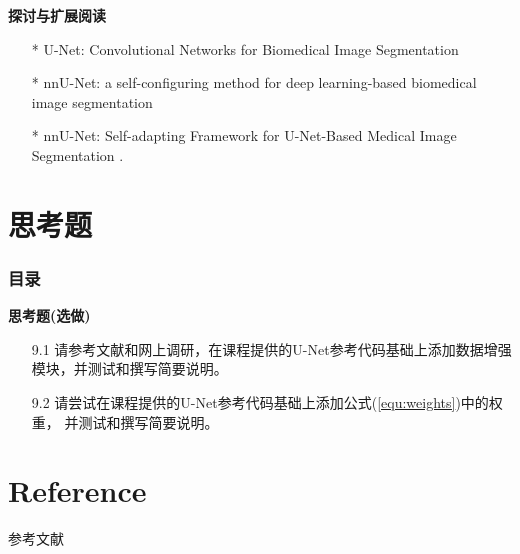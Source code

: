 \documentclass{beamer}%
\begin{document}
\begin{frame}[allowframebreaks]
\vspace{-0.1cm}
{\noindent\large\textbf{探讨与扩展阅读}}
\vspace{0.4cm}
\begin{itemize}
    \item[*] U-Net: Convolutional Networks for Biomedical Image Segmentation \citep{Unet2015Olaf}
    \item[*] nnU-Net: a self-configuring method for deep learning-based biomedical image segmentation \citep{Isensee2021NM}
    \item[*] nnU-Net: Self-adapting Framework for U-Net-Based Medical Image Segmentation \citep{Isensee2019}.
\end{itemize}
\end{frame}




\section{思考题}
\begin{frame}[allowframebreaks]
  \frametitle{\textsc{目录}} \vspace{-0.3cm}
    \begin{spacing}{0.0}
    \end{spacing}   %
\end{frame}


\begin{frame}[allowframebreaks]
\vspace{-0.1cm}
{\noindent\large\textbf{思考题(选做)}}
\vspace{0.4cm}
\begin{itemize}
    \item[9.1] 请参考文献\citet{Unet2015Olaf}和网上调研，在课程提供的U-Net参考代码基础上添加数据增强模块，并测试和撰写简要说明。
    \item[9.2] 请尝试在课程提供的U-Net参考代码基础上添加公式(\ref{equ:weights})中的权重， 并测试和撰写简要说明。
\end{itemize}
\end{frame}







\section{Reference}

\begin{frame}[allowframebreaks]{参考文献}
	\vspace{-0.3cm}
	\scriptsize%
	\normalem
\end{frame}
\end{document}
